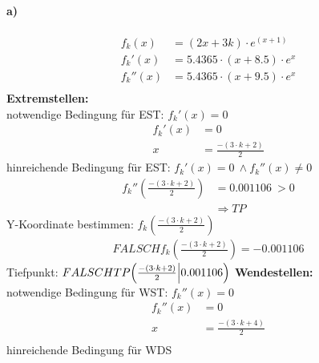 \documentclass[a4paper, 12pt]{report}
\begin{document}
	\paragraph{a)}
	\large
	\begin{align*}
		f_k(x) &= (2x + 3k) \cdot e^{(x+1)} \\
		f_k'(x) &= 5.4365 \cdot (x + 8.5) \cdot e^x \\
		f_k''(x) &= 5.4365 \cdot (x + 9.5) \cdot e^x \\
	\end{align*}
	\textbf{Extremstellen:} \\
	notwendige Bedingung für EST: $f_k'(x) = 0$
	\begin{align*}
		f_k'(x) &= 0 \\
		x &= \frac{-(3 \cdot k + 2)}{2}
	\end{align*}
	hinreichende Bedingung für EST: $f_k'(x) = 0\ \land f_k''(x) \neq 0$
	\begin{align*}
		f_k''(\frac{-(3 \cdot k + 2)}{2}) &= 0.001106\ > 0 \\
		&\Rightarrow TP
	\end{align*}
	Y-Koordinate bestimmen: $f_k(\frac{-(3 \cdot k + 2)}{2})$ \\
	\begin{align*}
	FALSCH
		f_k(\frac{-(3 \cdot k + 2)}{2})= -0.001106
	\end{align*}
	Tiefpunkt: $	FALSCH TP\Bigl(\frac{-(3 \cdot k + 2)}{2}\Bigl|0.001106\Bigl)$
	\newpage\noindent
	\textbf{Wendestellen:}
	\\
	notwendige Bedingung für WST: $f_k''(x) = 0$ \\
	\begin{align*}
		f_k''(x) &= 0 \\
		x &= \frac{-(3 \cdot k + 4)}{2} \\
	\end{align*}
	hinreichende Bedingung für WDS
\end{document}
